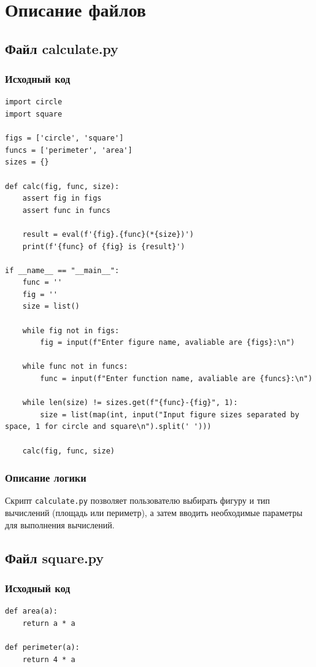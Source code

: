 \documentclass[a4paper,12pt]{article}
\begin{document}
\section{Описание файлов}

\subsection{Файл calculate.py}
\subsubsection{Исходный код}
\begin{lstlisting}
import circle
import square

figs = ['circle', 'square']
funcs = ['perimeter', 'area']
sizes = {}

def calc(fig, func, size):
    assert fig in figs
    assert func in funcs

    result = eval(f'{fig}.{func}(*{size})')
    print(f'{func} of {fig} is {result}')

if __name__ == "__main__":
    func = ''
    fig = ''
    size = list()

    while fig not in figs:
        fig = input(f"Enter figure name, avaliable are {figs}:\n")
    
    while func not in funcs:
        func = input(f"Enter function name, avaliable are {funcs}:\n")
    
    while len(size) != sizes.get(f"{func}-{fig}", 1):
        size = list(map(int, input("Input figure sizes separated by space, 1 for circle and square\n").split(' ')))
    
    calc(fig, func, size)
\end{lstlisting}

\subsubsection{Описание логики}
Скрипт \texttt{calculate.py} позволяет пользователю выбирать фигуру и тип вычислений (площадь или периметр), а затем вводить необходимые параметры для выполнения вычислений.

\subsection{Файл square.py}
\subsubsection{Исходный код}
\begin{lstlisting}
def area(a):
    return a * a

def perimeter(a):
    return 4 * a
\end{lstlisting}
\end{document}
